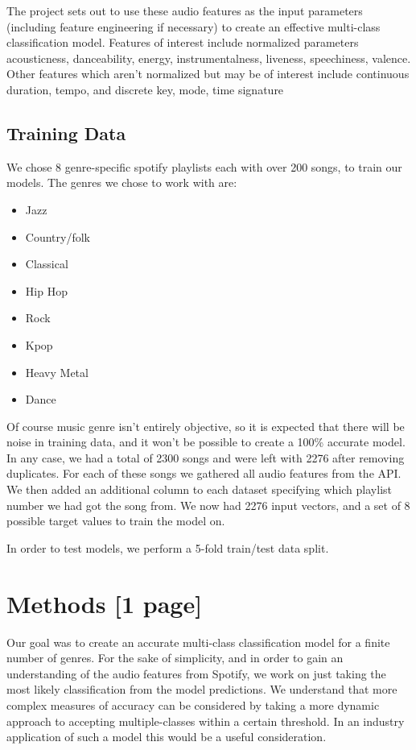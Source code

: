 \documentclass[10pt, a4]{article} %
\begin{document}
The project sets out to use these audio features as the input parameters (including feature engineering if necessary) to create an effective multi-class classification model. Features of interest include normalized parameters {acousticness, danceability, energy, instrumentalness, liveness, speechiness, valence}. Other features which aren't normalized but may be of interest include continuous {duration, tempo}, and discrete { key, mode, time signature}


\subsection*{Training Data}
We chose 8 genre-specific spotify playlists each with over 200 songs, to train our models. The genres we chose to work with are:
\begin{itemize}
\item Jazz
\item Country/folk
\item Classical
\item Hip Hop
\item Rock
\item Kpop
\item Heavy Metal
\item Dance
\end{itemize}


Of course music genre isn't entirely objective, so it is expected that there will be noise in training data, and it won't be possible to create a 100\% accurate model. In any case, we had a total of 2300 songs and were left with 2276 after removing duplicates. For each of these songs we gathered all audio features from the API. We then added an additional column to each dataset specifying which playlist number we had got the song from. We now had 2276 input vectors, and a set of 8 possible target values to train the model on.\newline

In order to test models, we perform a 5-fold train/test data split.\newline


\section*{Methods [1 page]}
Our goal was to create an accurate multi-class classification model for a finite number of genres. For the sake of simplicity, and in order to gain an understanding of the audio features from Spotify, we work on just taking the most likely classification from the model predictions. We understand that more complex measures of accuracy can be considered by taking a more dynamic approach to accepting multiple-classes within a certain threshold. In an industry application of such a model this would be a useful consideration.\newline 
\end{document}
